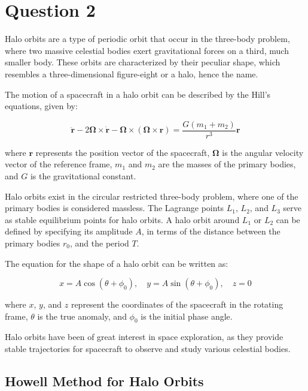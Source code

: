 \section{Question 2}
Halo orbits are a type of periodic orbit that occur in the three-body problem, where two massive celestial bodies exert gravitational forces on a third, much smaller body. These orbits are characterized by their peculiar shape, which resembles a three-dimensional figure-eight or a halo, hence the name.

The motion of a spacecraft in a halo orbit can be described by the Hill's equations, given by:

\begin{equation}
\ddot{\mathbf{r}} - 2\boldsymbol{\Omega}\times\dot{\mathbf{r}} - \boldsymbol{\Omega}\times(\boldsymbol{\Omega}\times\mathbf{r}) = \frac{{G(m_1 + m_2)}}{{r^3}}\mathbf{r}
\end{equation}

where $\mathbf{r}$ represents the position vector of the spacecraft, $\boldsymbol{\Omega}$ is the angular velocity vector of the reference frame, $m_1$ and $m_2$ are the masses of the primary bodies, and $G$ is the gravitational constant.

Halo orbits exist in the circular restricted three-body problem, where one of the primary bodies is considered massless. The Lagrange points $L_1$, $L_2$, and $L_3$ serve as stable equilibrium points for halo orbits. A halo orbit around $L_1$ or $L_2$ can be defined by specifying its amplitude $A$, in terms of the distance between the primary bodies $r_0$, and the period $T$.

The equation for the shape of a halo orbit can be written as:

\begin{equation}
x = A\cos(\theta + \phi_0), \quad y = A\sin(\theta + \phi_0), \quad z = 0
\end{equation}

where $x$, $y$, and $z$ represent the coordinates of the spacecraft in the rotating frame, $\theta$ is the true anomaly, and $\phi_0$ is the initial phase angle.

Halo orbits have been of great interest in space exploration, as they provide stable trajectories for spacecraft to observe and study various celestial bodies.


\subsection{Howell Method for Halo Orbits}

